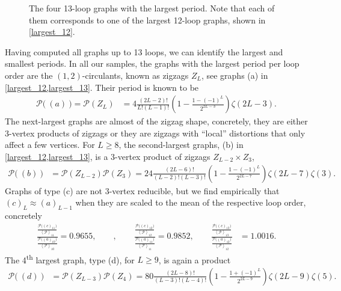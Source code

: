 \documentclass[11pt,a4paper]{article}
\newcommand{\period}{\mathcal P}
\renewcommand{\|}{\rule[-0.4ex]{0.2ex}{1.2em}}
\begin{document}
\begin{figure}[htb]
	\caption{The four 13-loop graphs with the largest period. Note that each of them corresponds   to one of the largest 12-loop graphs, shown in \cref{largest_12}.}
	\label{largest_13}
\end{figure}




Having computed all graphs up to 13 loops, we can identify the largest and smallest periods. 
In all our samples, the graphs with the largest period per loop order are the $(1,2)$-circulants, known as zigzags $Z_L$, see graphs (a) in \cref{largest_12,largest_13}. Their period is known to be \cite{broadhurst_knots_1995,brown_singlevalued_2015}
\begin{align}\label{zigzag_amplitude}
	\period \big( ~(a)~\big)=\period(Z_L) &= 4 \frac{(2L-2)!}{L! (L-1)!} \left( 1- \frac{1-(-1)^L}{2^{2L-3}} \right) \zeta(2L-3).
\end{align}
The next-largest graphs are almost of the zigzag shape, concretely, they are either 3-vertex products of zigzags or they are zigzags with \enquote{local} distortions that only affect a few vertices. For $L\geq 8$, the second-largest graphs, (b) in \cref{largest_12,largest_13}, is a 3-vertex product of   zigzags $Z_{L-2}\times Z_3$, 
\begin{align*}
	\period \big(  ~(b)~\big) &= \period(Z_{L-2}) \period(Z_3)=24 \frac{(2L-6)!}{(L-2)! (L-3)!} \left( 1- \frac{1-(-1)^L}{2^{2L-7}} \right) \zeta(2L-7) \zeta(3).
\end{align*}
Graphs of type (c) are not 3-vertex reducible, but we find empirically that $(c)_L \approx (a)_{L-1}$ when they are scaled to the mean of the respective loop order, concretely
\begin{align*}
	 \frac{\frac{\period \big( (c)_{11} \big)}{\left \langle \period \right \rangle _{11}}}{\frac{\period \big( (a)_{10} \big)}{\left \langle \period \right \rangle _{10}}}= 0.9655, \qquad , \qquad \frac{\frac{\period \big( (c)_{12} \big)}{\left \langle \period \right \rangle _{12}}}{\frac{\period \big( (a)_{11} \big) }{\left \langle \period \right \rangle _{11}}} = 0.9852, \qquad\frac{\frac{\period \big( (c)_{13} \big)}{\left \langle \period \right \rangle _{13}}}{\frac{\period \big( (a)_{12} \big)}{\left \langle \period \right \rangle _{12}}} &= 1.0016.
\end{align*} 
The 4\textsuperscript{th} largest graph, type (d), for $L\geq 9$, is again a product
\begin{align*}
	\period \big(  ~(d)~\big) &= \period(Z_{L-3}) \period(Z_4)=80 \frac{(2L-8)!}{(L-3)! (L-4)!} \left( 1- \frac{1+(-1)^L}{2^{2L-9}} \right) \zeta(2L-9) \zeta(5).
\end{align*}
\end{document}
